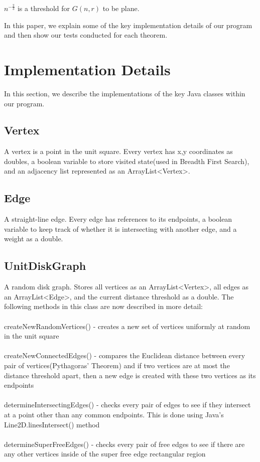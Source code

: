 \documentclass{article}
\newcommand{\dg}{G(n,r)}
\newenvironment{customthm}[1]{\renewcommand\theinnercustomthm{#1}\innercustomthm}{\endinnercustomthm}
\begin{document}
\begin{customthm}{4}
\label{plane-thr}
$n^{-\frac{2}{3}}$ is a threshold for $\dg$ to be plane.
\end{customthm}

In this paper, we explain some of the key implementation details of our program and then show our tests conducted for each theorem.

\newpage
\section{Implementation Details}
In this section, we describe the implementations of the key Java classes within our program.

\subsection*{Vertex}
A vertex is a point in the unit square. Every vertex has x,y coordinates as doubles, a boolean variable to store visited state(used in Breadth First Search), and an adjacency list represented as an ArrayList\textless Vertex\textgreater.

\subsection*{Edge}
A straight-line edge. Every edge has references to its endpoints, a boolean variable to keep track of whether it is intersecting with another edge, and a weight as a double.

\subsection*{UnitDiskGraph}
A random disk graph. Stores all vertices as an ArrayList\textless Vertex\textgreater, all edges as an ArrayList\textless Edge\textgreater, and the current distance threshold as a double. The following methods in this class are now described in more detail:\\ \\
createNewRandomVertices() - creates a new set of vertices uniformly at random in the unit square\\ \\
createNewConnectedEdges() - compares the Euclidean distance between every pair of vertices(Pythagoras' Theorem) and if two vertices are at most the distance threshold apart, then a new edge is created with these two vertices as its endpoints\\ \\
determineIntersectingEdges() - checks every pair of edges to see if they intersect at a point other than any common endpoints. This is done using Java's Line2D.linesIntersect() method\\ \\
determineSuperFreeEdges() - checks every pair of free edges to see if there are any other vertices inside of the super free edge rectangular region
\end{document}
